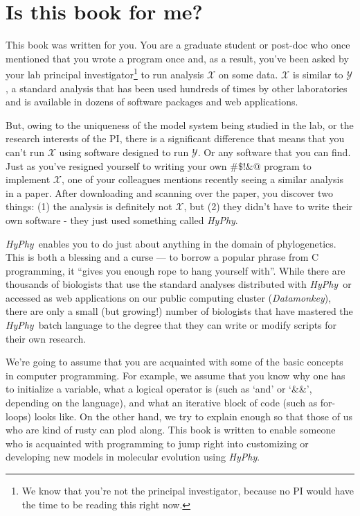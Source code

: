 \documentclass[12pt]{book}
\newcommand{\hyphy}{\textit{HyPhy}}
\begin{document}

\section {Is this book for me?}

This book was written for you.  You are a graduate student or post-doc who once mentioned that you wrote a program once and, as a result, you've been asked by your lab principal investigator\footnote{We know that you're not the principal investigator, because no PI would have the time to be reading this right now.} to run analysis $\mathcal{X}$ on some data.  $\mathcal{X}$ is similar to $\mathcal{Y}$, a standard analysis that has been used hundreds of times by other laboratories and is available in dozens of software packages and web applications.  

But, owing to the uniqueness of the model system being studied in the lab, or the research interests of the PI, there is a significant difference that means that you can't run $\mathcal{X}$ using software designed to run $\mathcal{Y}$.  Or any software that you can find.  Just as you've resigned yourself to writing your own $\#\$!\&@$ program to implement $\mathcal{X}$, one of your colleagues mentions recently seeing a similar analysis in a paper.  After downloading and scanning over the paper, you discover two things: (1) the analysis is definitely not $\mathcal{X}$, but (2) they didn't have to write their own software - they just used something called {\it HyPhy}.  

\hyphy\ enables you to do just about anything in the domain of phylogenetics.  This is both a blessing and a curse --- to borrow a popular phrase from C programming, it ``gives you enough rope to hang yourself with''.  While there are thousands of biologists that use the standard analyses distributed with \hyphy\ or accessed as web applications on our public computing cluster ({\it Datamonkey}), there are only a small (but growing!) number of biologists that have mastered the \hyphy\ batch language to the degree that they can write or modify scripts for their own research.  

We're going to assume that you are acquainted with some of the basic concepts in computer programming.  For example, we assume that you know why one has to initialize a variable, what a logical operator is (such as `and' or `\&\&', depending on the language), and what an iterative block of code (such as for-loops) looks like.  On the other hand, we try to explain enough so that those of us who are kind of rusty can plod along.  This book is written to enable someone who is acquainted with programming to jump right into customizing or developing new models in molecular evolution using \hyphy.
\end{document}
